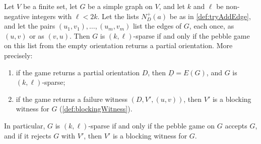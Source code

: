 \begin{theorem}
  \label{thm:pebble-game-correct}
  \leanok
  Let $V$ be a finite set, let $G$ be a simple graph on $V$, and let $k$
  and $\ell$ be non-negative integers with $\ell < 2k$. Let the lists
  $N^+_D(a)$ be as in \cref{def:tryAddEdge}, and let the pairs
  $(u_1, v_1), \ldots, (u_m, v_m)$ list the edges of $G$, each once, as
  $(u, v)$ or as $(v, u)$. Then $G$ is $(k, \ell)$-sparse if and only if
  the pebble game on this list from the empty orientation returns a
  partial orientation. More precisely:
  \begin{enumerate}
    \item if the game returns a partial orientation $D$, then
      $\underline{D} = E(G)$, and $G$ is $(k, \ell)$-sparse;
    \item if the game returns a failure witness $(D, V', (u, v))$, then
      $V'$ is a blocking witness for $G$ (\cref{def:blockingWitness}).
  \end{enumerate}
  In particular, $G$ is $(k, \ell)$-sparse if and only if the pebble
  game on $G$ accepts $G$, and if it rejects $G$ with $V'$, then $V'$ is
  a blocking witness for $G$.
\end{theorem}
